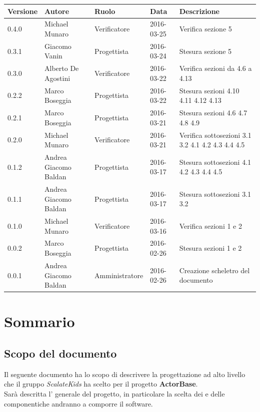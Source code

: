 \documentclass{scalatekids-article}
\begin{document}
\begin{center}
  \begin{tabular}{| l | l | l | l | p{5cm} |}
    \hline
    Versione & Autore & Ruolo & Data & Descrizione \\
    \hline
    0.4.0 & Michael Munaro & Verificatore & 2016-03-25 & Verifica sezione 5\\
    \hline
    0.3.1 & Giacomo Vanin & Progettista & 2016-03-24 & Stesura sezione 5\\
    \hline
    0.3.0 & Alberto De Agostini & Verificatore & 2016-03-22 & Verifica sezioni da 4.6 a 4.13\\
    \hline
    0.2.2 & Marco Boseggia & Progettista & 2016-03-22 & Stesura sezioni 4.10 4.11 4.12 4.13\\
    \hline
    0.2.1 & Marco Boseggia & Progettista & 2016-03-21 & Stesura sezioni 4.6 4.7 4.8 4.9\\
    \hline
    0.2.0 & Michael Munaro & Verificatore & 2016-03-21 & Verifica sottosezioni 3.1 3.2 4.1 4.2 4.3 4.4 4.5\\
    \hline
    0.1.2 & Andrea Giacomo Baldan & Progettista & 2016-03-17 & Stesura sottosezioni 4.1 4.2 4.3 4.4 4.5\\
    \hline
    0.1.1 & Andrea Giacomo Baldan & Progettista & 2016-03-17 & Stesura sottosezioni 3.1 3.2\\
    \hline
    0.1.0 & Michael Munaro & Verificatore & 2016-03-16 & Verifica sezioni 1 e 2\\
    \hline
    0.0.2 & Marco Boseggia & Progettista & 2016-02-26 & Stesura sezioni 1 e 2\\
    \hline
    0.0.1 & Andrea Giacomo Baldan & Amministratore & 2016-02-26 & Creazione scheletro del documento\\
    \hline
  \end{tabular}
\end{center}
\newpage
\tableofcontents
\newpage
{}

\section{Sommario}

\subsection{Scopo del documento}

Il seguente documento ha lo scopo di descrivere la progettazione ad alto livello
che il gruppo \textit{ScalateKids} ha scelto per il
progetto \textbf{ActorBase}.\\  Sarà descritta l' generale
del progetto, in particolare  la scelta dei  e delle
componentiche andranno a comporre il software.
\end{document}
